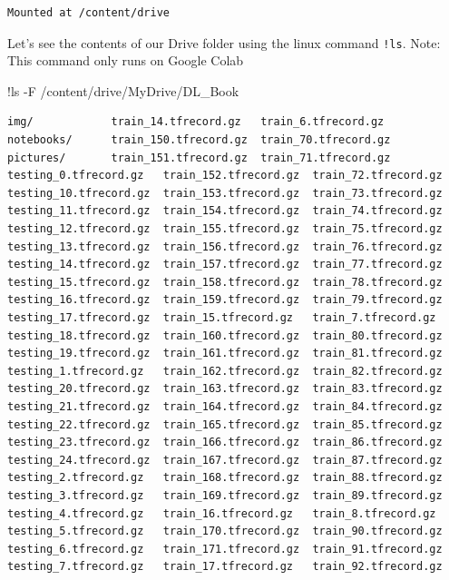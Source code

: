 \documentclass[
  letterpaper,
  DIV=11,
  numbers=noendperiod]{scrreprt}
\newenvironment{Shaded}{\begin{snugshade}}{\end{snugshade}}
\newcommand{\NormalTok}[1]{\textcolor[rgb]{0.00,0.23,0.31}{#1}}
\newcommand{\OperatorTok}[1]{\textcolor[rgb]{0.37,0.37,0.37}{#1}}
\begin{document}
\begin{verbatim}
Mounted at /content/drive
\end{verbatim}

Let's see the contents of our Drive folder using the linux command
\texttt{!ls}. Note: This command only runs on Google Colab

\begin{Shaded}
\begin{Highlighting}[]
\OperatorTok{!}\NormalTok{ls }\OperatorTok{{-}}\NormalTok{F }\OperatorTok{/}\NormalTok{content}\OperatorTok{/}\NormalTok{drive}\OperatorTok{/}\NormalTok{MyDrive}\OperatorTok{/}\NormalTok{DL\_Book}
\end{Highlighting}
\end{Shaded}

\begin{verbatim}
img/            train_14.tfrecord.gz   train_6.tfrecord.gz
notebooks/      train_150.tfrecord.gz  train_70.tfrecord.gz
pictures/       train_151.tfrecord.gz  train_71.tfrecord.gz
testing_0.tfrecord.gz   train_152.tfrecord.gz  train_72.tfrecord.gz
testing_10.tfrecord.gz  train_153.tfrecord.gz  train_73.tfrecord.gz
testing_11.tfrecord.gz  train_154.tfrecord.gz  train_74.tfrecord.gz
testing_12.tfrecord.gz  train_155.tfrecord.gz  train_75.tfrecord.gz
testing_13.tfrecord.gz  train_156.tfrecord.gz  train_76.tfrecord.gz
testing_14.tfrecord.gz  train_157.tfrecord.gz  train_77.tfrecord.gz
testing_15.tfrecord.gz  train_158.tfrecord.gz  train_78.tfrecord.gz
testing_16.tfrecord.gz  train_159.tfrecord.gz  train_79.tfrecord.gz
testing_17.tfrecord.gz  train_15.tfrecord.gz   train_7.tfrecord.gz
testing_18.tfrecord.gz  train_160.tfrecord.gz  train_80.tfrecord.gz
testing_19.tfrecord.gz  train_161.tfrecord.gz  train_81.tfrecord.gz
testing_1.tfrecord.gz   train_162.tfrecord.gz  train_82.tfrecord.gz
testing_20.tfrecord.gz  train_163.tfrecord.gz  train_83.tfrecord.gz
testing_21.tfrecord.gz  train_164.tfrecord.gz  train_84.tfrecord.gz
testing_22.tfrecord.gz  train_165.tfrecord.gz  train_85.tfrecord.gz
testing_23.tfrecord.gz  train_166.tfrecord.gz  train_86.tfrecord.gz
testing_24.tfrecord.gz  train_167.tfrecord.gz  train_87.tfrecord.gz
testing_2.tfrecord.gz   train_168.tfrecord.gz  train_88.tfrecord.gz
testing_3.tfrecord.gz   train_169.tfrecord.gz  train_89.tfrecord.gz
testing_4.tfrecord.gz   train_16.tfrecord.gz   train_8.tfrecord.gz
testing_5.tfrecord.gz   train_170.tfrecord.gz  train_90.tfrecord.gz
testing_6.tfrecord.gz   train_171.tfrecord.gz  train_91.tfrecord.gz
testing_7.tfrecord.gz   train_17.tfrecord.gz   train_92.tfrecord.gz

\end{verbatim}
\end{document}
